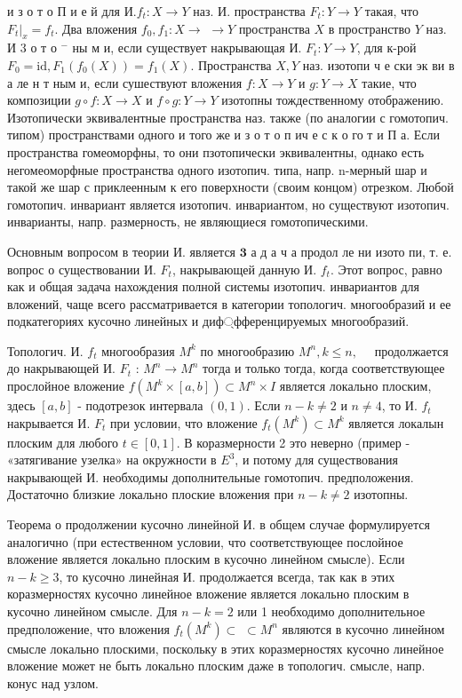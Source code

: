 \documentclass[10pt]{article}
\begin{document}
и $з$ о т о П и е й для $И . f_{t}: X \rightarrow Y$ наз. И. пространства $F_{t}: Y \rightarrow Y$ такая, что $\left.F_{t}\right|_{x}=f_{t}$. Два вложения $f_{0}, f_{1}: X \rightarrow$ $\rightarrow Y$ пространства $X$ в пространство $Y$ наз. И 3 о т о ${ }^{-}$ ны м и, если существует накрывающая И. $F_{t}: Y \rightarrow Y$, для к-рой $F_{0}=\mathrm{id}, F_{1}\left(f_{0}(X)\right)=f_{1}(X)$. Пространства $X, Y$ наз. изотопи ч е ски эк ви в а ле н т ным и, если сушествуют вложения $f: X \rightarrow Y$ и $g: Y \rightarrow X$ такие, что композиции $g \circ f: X \rightarrow X$ и $f \circ g: Y \rightarrow Y$ изотопны тождественному отображению. Изотопически эквивалентные пространства наз. также (по аналогии с гомотопич. типом) пространствами одного и того же и з о т о п ич е с к о го т и П а. Если пространства гомеоморфны, то они пзотопически эквивалентны, однако есть негомеоморфные пространства одного изотопич. типа, напр. n-мерный шар и такой же шар с приклеенным к его поверхности (своим концом) отрезком. Любой гомотопич. инвариант является изотопич. инвариантом, но существуют изотопич. инварианты, напр. размерность, не являющиеся гомотопическими.



Основным вопросом в теории И. является $\mathbf{3}$ а д а ч а продол ле ни изото пи, т. е. вопрос о существовании И. $F_{t}$, накрывающей данную И. $f_{t}$. Этот вопрос, равно как и общая задача нахождения полной системы изотопич. инвариантов для вложений, чаще всего рассматривается в категории топологич. многообразий и ее подкатегориях кусочно линейных и диф্фференцируемых многообразий.



Топологич. И. $f_{t}$ многообразия $M^{k}$ по многообразию $M^{n}, k \leqslant n, \quad$ продолжается до накрывающей И. $F_{t}$ : $M^{n} \rightarrow M^{n}$ тогда и только тогда, когда соответствующее прослойное вложение $f\left(M^{k} \times[a, b]\right) \subset M^{n} \times I$ является локально плоским, здесь $[a, b]$ - подотрезок интервала $(0,1)$. Если $n-k \neq 2$ и $n \neq 4$, то И. $f_{t}$ накрывается И. $F_{t}$ при условии, что вложение $f_{t}\left(M^{k}\right) \subset M^{k}$ является локалын плоским для любого $t \in[0,1]$. В коразмерности 2 это неверно (пример - «затягивание узелка» на окружности в $E^{3}$, и потому для существования накрывающей И. необходимы дополнительные гомотопич. предположения. Достаточно близкие локально плоские вложения при $n-k \neq 2$ изотопны.



Теорема о продолжении кусочно линейной И. в общем случае формулируется аналогично (при естественном условии, что соответствующее послойное вложение является локально плоским в кусочно линейном смысле). Если $n-k \geqslant 3$, то кусочно линейная И. продолжается всегда, так как в этих коразмерностях кусочно линейное вложение является локально плоским в кусочно линейном смысле. Для $n-k=2$ или 1 необходимо дополнительное предположение, что вложения $f_{t}\left(M^{k}\right) \subset$ $\subset M^{n}$ являются в кусочно линейном смысле локально плоскими, поскольку в этих коразмерностях кусочно линейное вложение может не быть локально плоским даже в топологич. смысле, напр. конус над узлом.
\end{document}
